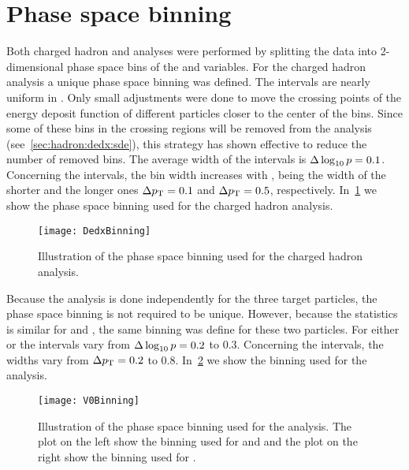 \section{\boldmath Phase space binning}
\label{sec:hadron:binning}

Both charged hadron and \vzero analyses were performed
by splitting the data into 2-dimensional phase space bins
of the \pp and \pT variables. For the
charged hadron analysis a unique phase space
binning was defined. The \pp intervals 
are nearly uniform in \logp. Only small adjustments
were done to move the crossing points of the energy deposit function
of different particles closer to the center of the bins.
Since some of these bins in the crossing regions
will be removed from the analysis (see~\cref{sec:hadron:dedx:sde}),
this strategy has shown effective to reduce the number of
removed bins. The average width of the \logp intervals is
$\Delta\log_{10} p=0.1$. Concerning the \pT intervals, the bin width
increases with \pT, being the width of the shorter and the longer ones
$\Delta p_\text{T}=0.1$ and  $\Delta p_\text{T}=0.5$, respectively.  
In~\cref{fig:hadron:binning:dedx} we show the
phase space binning used for the charged hadron analysis.


\begin{figure}[!ht]
  \centering
  \texttt{[image: DedxBinning]}
  \caption{Illustration of the phase space binning used
    for the charged hadron analysis.}
  \label{fig:hadron:binning:dedx}
\end{figure}

Because the \vzero analysis is done independently for the three target particles,
the phase space binning is not required to be unique.
However, because the statistics is similar for \lamb and \antilamb,
the same binning was define for these two particles.
For either \lambs or \kzeros the \pp intervals vary from
$\Delta\log_{10} p=0.2$ to $0.3$. Concerning the \pT intervals,
the widths vary from $\Delta p_\text{T} = 0.2$ to $0.8$.
In~\cref{fig:hadron:binning:vzero} we show the 
binning used for the \vzero analysis.

\begin{figure}[!ht]
  \centering
  \texttt{[image: V0Binning]}
  \caption{Illustration of the phase space binning used
    for the \vzero analysis. The plot on the left show the binning
    used for \lamb and \antilamb and the plot on the right
    show the binning used for \kzeros.}
  \label{fig:hadron:binning:vzero}
\end{figure}


